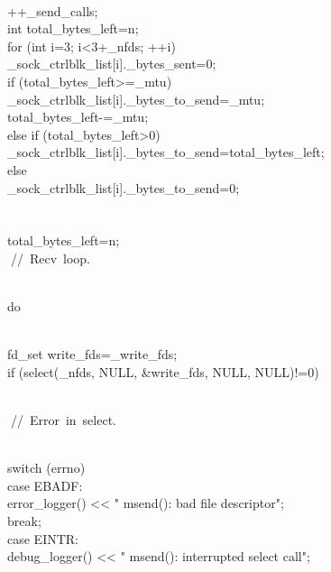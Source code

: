 \documentclass{article}
\begin{document}
 {
\\
         ++_send_calls;
\\
         int total_bytes_left=n;
\\
         for (int i=3; i<3+_nfds; ++i) {
\\
                 _sock_ctrlblk_list[i]._bytes_sent=0;
\\
                 if (total_bytes_left>=_mtu) {
\\
                         _sock_ctrlblk_list[i]._bytes_to_send=_mtu;
\\
                         total_bytes_left-=_mtu;
\\
                 } else if (total_bytes_left>0) {
\\
                         _sock_ctrlblk_list[i]._bytes_to_send=total_bytes_left;
\\
                 } else {
\\
                         _sock_ctrlblk_list[i]._bytes_to_send=0;
\\
                 }
\\
         }
\\
         total_bytes_left=n;
\\
         
\hbox{// Recv loop.}\strut\\
         do {
\\
                 fd_set write_fds=_write_fds;
\\
                 if (select(_nfds, NULL, &write_fds, NULL, NULL)!=0) {
\\
                         
\hbox{// Error in select.}\strut\\
                         switch (errno) {
\\
                         case EBADF:
\\
                                 error_logger() << "    msend(): bad file descriptor\n";
\\
                                 break;
\\
                         case EINTR:
\\
                                 debug_logger() << "    msend(): interrupted select call\n";
}}}}
\end{document}
